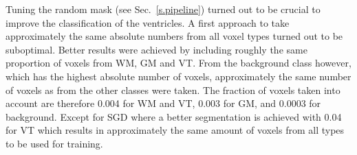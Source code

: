 \documentclass[journal]{IEEEtran}
\begin{document}
Tuning the random mask (see Sec.~\ref{s.pipeline}) turned out to be crucial to improve the classification of the ventricles. A first approach to take approximately the same absolute numbers from all voxel types turned out to be suboptimal. Better results were achieved by including roughly the same proportion of voxels from WM, GM and VT. From the background class however, which has the highest absolute number of voxels, approximately the same number of voxels as from the other classes were taken. The fraction of voxels taken into account are therefore 0.004 for WM and VT, 0.003 for GM, and 0.0003 for background. Except for SGD where a better segmentation is achieved with 0.04 for VT which results in approximately the same amount of voxels from all types to be used for training.

\begin{figure}[h!]
	\centering
	\hfill
	\hfill
	\hfill

\end{figure}
\end{document}
